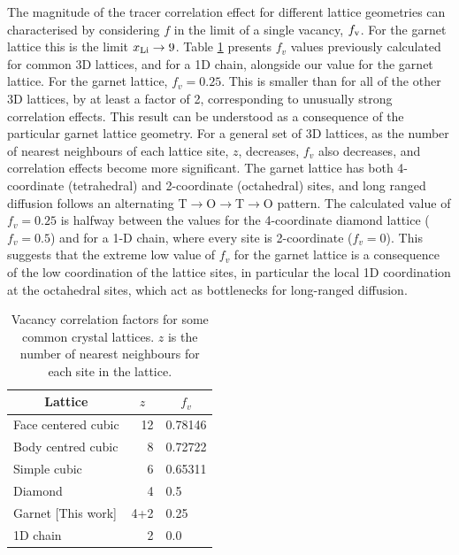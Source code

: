 \documentclass[aps,prb,twocolumn,superscriptaddress,reprint]{revtex4-1}
\newcommand{\xLi}{x_\m{Li}}
\begin{document}
The magnitude of the tracer correlation effect for different lattice geometries can characterised by considering $f$ in the limit of a single vacancy, $f_{\mathrm{v}}$. 
For the garnet lattice this is the limit $\xLi\to9$. 
Table \ref{tab:vacancy_correlation_factors} presents $f_v$ values previously calculated for common 3D lattices,\cite{CompaanAndHaven_TransFaradaySoc1956} and for a 1D chain,\cite{Mehrer_DiffusionBook} alongside our value for the garnet lattice. 
For the garnet lattice, $f_v=0.25$. 
This is smaller than for all of the other 3D lattices, by at least a factor of 2, corresponding to unusually strong correlation effects. 
This result can be understood as a consequence of the particular garnet lattice geometry. 
For a general set of 3D lattices, as the number of nearest neighbours of each lattice site, $z$, decreases, $f_v$ also decreases, and correlation effects become more significant. 
The garnet lattice has both 4-coordinate (tetrahedral) and 2-coordinate (octahedral) sites, and long ranged diffusion follows an alternating T$\to$O$\to$T$\to$O pattern. 
The calculated value of $f_v=0.25$ is halfway between the values for the 4-coordinate diamond lattice ($f_v=0.5$) and for a 1-D chain, where every site is 2-coordinate ($f_v=0$). 
This suggests that the extreme low value of $f_v$ for the garnet lattice is a consequence of the low coordination of the lattice sites, in particular the local 1D coordination at the octahedral sites, which act as bottlenecks for long-ranged diffusion. 

\begin{table}[htb]
   \begin{center}
     \begin{tabular}{lrl} \hline
        \multicolumn{1}{c}{Lattice} & \multicolumn{1}{c}{$z$} & \multicolumn{1}{c}{$f_v$} \\ \hline
        Face centered cubic\cite{CompaanAndHaven_TransFaradaySoc1956} & 12 & 0.78146 \\
        Body centred cubic\cite{CompaanAndHaven_TransFaradaySoc1956} & 8 & 0.72722 \\
        Simple cubic\cite{CompaanAndHaven_TransFaradaySoc1956} & 6 & 0.65311 \\
        Diamond\cite{CompaanAndHaven_TransFaradaySoc1956} & 4 & 0.5 \\
        Garnet [This work] & 4+2 & 0.25 \\ 
        1D chain\cite{Mehrer_DiffusionBook} & 2 & 0.0 \\ \hline
     \end{tabular}
   \caption{\label{tab:vacancy_correlation_factors}Vacancy correlation factors for some common crystal lattices. $z$ is the number of nearest neighbours for each site in the lattice.}
   \end{center}
 \end{table}
\end{document}
